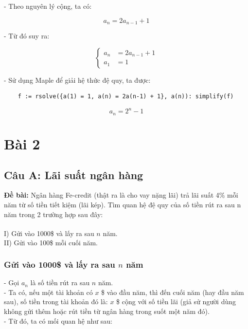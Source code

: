 \documentclass[12pt]{article}
\begin{document}
\begin{sloppypar}
- Theo nguyên lý cộng, ta có:

\begin{equation*}
    a_{n} = 2a_{n-1} + 1
\end{equation*}

- Từ đó suy ra:

\[
    \begin{cases}
        a_{n} & = 2a_{n - 1} + 1 \\             
        a_{1} & = 1 
    \end{cases}
    \]

- Sử dụng Maple để giải hệ thức đệ quy, ta được:

\begin{verbatim}
    f := rsolve({a(1) = 1, a(n) = 2a(n-1) + 1}, a(n)): simplify(f)
\end{verbatim}

\begin{equation*}
    a_{n} = 2^{n} - 1
\end{equation*}

\section{Bài 2}

\subsection{Câu A: Lãi suất ngân hàng}
\begin{tcolorbox}
    \textbf{Đề bài:} Ngân hàng Fe-credit (thật ra là cho vay nặng lãi) trả lãi suất 4\% mỗi năm từ số tiền tiết kiệm (lãi kép). Tìm quan hệ đệ quy của số tiền rút ra sau n năm trong 2 trường hợp sau đây: \\ \\
    I)  Gửi vào 1000\$ và lấy ra sau \(n\) năm. \\
    II) Gửi vào 100\$ mỗi cuối năm.
\end{tcolorbox}

\subsubsection{Gửi vào 1000\$ và lấy ra sau \(n\) năm}

- Gọi \(a_{n}\) là số tiền rút ra sau \(n\) năm. \\
- Ta có, nếu một tài khoản có \(x\) \$ vào đầu năm, thì đến cuối năm (hay đầu năm sau), số tiền trong tài khoản đó là: \(x\) \$ cộng với số tiền lãi (giả sử người dùng không gửi thêm hoặc rút tiền từ ngân hàng trong suốt một năm đó). \\
- Từ đó, ta có mối quan hệ như sau:


\end{sloppypar}
\end{document}
